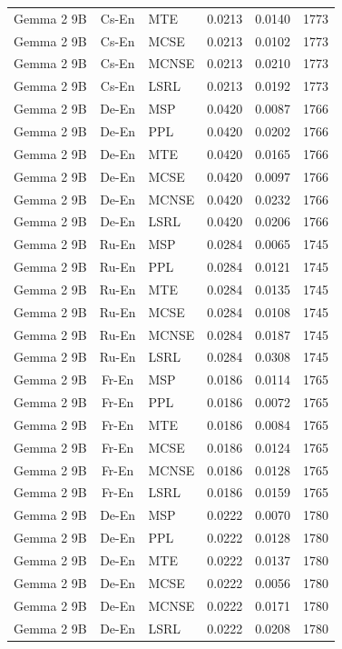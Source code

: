 \begin{table}
\begin{tabular}{lc}
Gemma 2 9B & Cs-En & MTE & 0.0213 & 0.0140 & 1773 \\
Gemma 2 9B & Cs-En & MCSE & 0.0213 & 0.0102 & 1773 \\
Gemma 2 9B & Cs-En & MCNSE & 0.0213 & 0.0210 & 1773 \\
Gemma 2 9B & Cs-En & LSRL & 0.0213 & 0.0192 & 1773 \\
Gemma 2 9B & De-En & MSP & 0.0420 & 0.0087 & 1766 \\
Gemma 2 9B & De-En & PPL & 0.0420 & 0.0202 & 1766 \\
Gemma 2 9B & De-En & MTE & 0.0420 & 0.0165 & 1766 \\
Gemma 2 9B & De-En & MCSE & 0.0420 & 0.0097 & 1766 \\
Gemma 2 9B & De-En & MCNSE & 0.0420 & 0.0232 & 1766 \\
Gemma 2 9B & De-En & LSRL & 0.0420 & 0.0206 & 1766 \\
Gemma 2 9B & Ru-En & MSP & 0.0284 & 0.0065 & 1745 \\
Gemma 2 9B & Ru-En & PPL & 0.0284 & 0.0121 & 1745 \\
Gemma 2 9B & Ru-En & MTE & 0.0284 & 0.0135 & 1745 \\
Gemma 2 9B & Ru-En & MCSE & 0.0284 & 0.0108 & 1745 \\
Gemma 2 9B & Ru-En & MCNSE & 0.0284 & 0.0187 & 1745 \\
Gemma 2 9B & Ru-En & LSRL & 0.0284 & 0.0308 & 1745 \\
Gemma 2 9B & Fr-En & MSP & 0.0186 & 0.0114 & 1765 \\
Gemma 2 9B & Fr-En & PPL & 0.0186 & 0.0072 & 1765 \\
Gemma 2 9B & Fr-En & MTE & 0.0186 & 0.0084 & 1765 \\
Gemma 2 9B & Fr-En & MCSE & 0.0186 & 0.0124 & 1765 \\
Gemma 2 9B & Fr-En & MCNSE & 0.0186 & 0.0128 & 1765 \\
Gemma 2 9B & Fr-En & LSRL & 0.0186 & 0.0159 & 1765 \\
Gemma 2 9B & De-En & MSP & 0.0222 & 0.0070 & 1780 \\
Gemma 2 9B & De-En & PPL & 0.0222 & 0.0128 & 1780 \\
Gemma 2 9B & De-En & MTE & 0.0222 & 0.0137 & 1780 \\
Gemma 2 9B & De-En & MCSE & 0.0222 & 0.0056 & 1780 \\
Gemma 2 9B & De-En & MCNSE & 0.0222 & 0.0171 & 1780 \\
Gemma 2 9B & De-En & LSRL & 0.0222 & 0.0208 & 1780 \\

\end{tabular}
\end{table}
